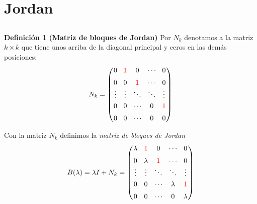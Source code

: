 \section{Jordan}

\subsection{}

{\nologo
\begin{frame}%

\begin{block}{\textbf{Definición 1 (Matriz de bloques de Jordan)}}
	\justifying
	Por $N_k$ denotamos a la matriz $k\times k$ que tiene unos arriba de la diagonal principal y ceros en las demás
	posiciones:
	\[
	N_k = 
	\left(
	\begin{array}{@{\hspace{0.1\tabcolsep}}c@{\hspace{1.5\tabcolsep}}c@{\hspace{1.5\tabcolsep}}c@{\hspace{1.5\tabcolsep}}c@{\hspace{1.5\tabcolsep}}c@{\hspace{0.1\tabcolsep}}}
	     0 & {\color{red}1} & 0 & \cdots & 0 \\[2mm]
	     0 & 0              & {\color{red}1} & \cdots & 0 \\[0mm]
	\vdots & \vdots         &  \ddots         & \ddots & \vdots \\[1mm]
  		 0 & 0              & \cdots  & 0 & {\color{red}1} \\[2mm]
  		 0 & 0              & \cdots  & 0 & 0 \\[0mm]
	\end{array}
	\right) 	
	\]
	
	Con la matriz $N_k$ definimos la \textit{matriz de bloques de Jordan}
	\[
	B(\lambda) = \lambda I + N_k = 
	\left(
	\begin{array}{@{\hspace{0.1\tabcolsep}}c@{\hspace{1.5\tabcolsep}}c@{\hspace{1.5\tabcolsep}}c@{\hspace{1.5\tabcolsep}}c@{\hspace{1.5\tabcolsep}}c@{\hspace{0.1\tabcolsep}}}
	\lambda & {\color{red}1} & 0 & \cdots & 0 \\[2mm]
	0 & \lambda              & {\color{red}1} & \cdots & 0 \\[0mm]
	\vdots & \vdots         &  \ddots         & \ddots & \vdots \\[1mm]
	0 & 0              & \cdots  & \lambda & {\color{red}1} \\[2mm]
	0 & 0              & \cdots  & 0 & \lambda \\[0mm]
	\end{array}
	\right) 	
	\]
\end{block}

\end{frame}
}

